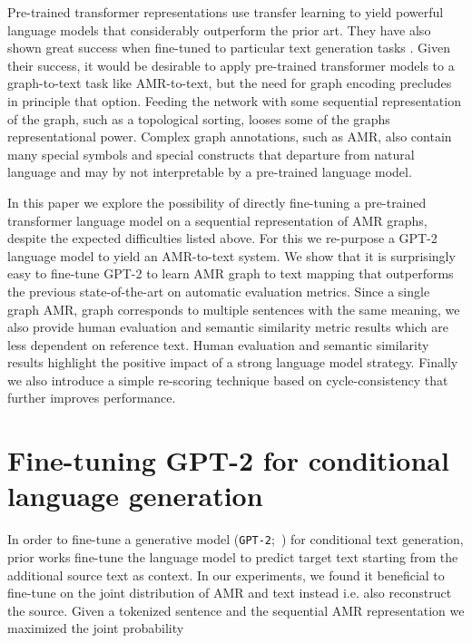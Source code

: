 \documentclass[11pt,a4paper]{article}
\newcommand{\GPT}{\texttt{GPT-2}}
\begin{document}
Pre-trained transformer representations \cite{radford2018improving,devlin2019bert,radford2019language} use transfer learning to yield powerful language models that considerably outperform the prior art. They have also shown great success when fine-tuned to particular text generation tasks \cite{see2019massively,zhang2019dialogpt,keskar2019ctrl}. Given their success, it would be desirable to apply pre-trained transformer models to a graph-to-text task like AMR-to-text, but the need for graph encoding precludes in principle that option. Feeding the network with some sequential representation of the graph, such as a topological sorting, looses some of the graphs representational power. Complex graph annotations, such as AMR, also contain many special symbols and special constructs that departure from natural language and may by not interpretable by a pre-trained language model.

In this paper we explore the possibility of directly fine-tuning a pre-trained transformer language model on a sequential representation of AMR graphs, despite the expected difficulties listed above. For this we re-purpose a GPT-2 language model \cite{radford2019language} to yield an AMR-to-text system. We show that it is surprisingly easy to fine-tune GPT-2 to learn AMR graph to text mapping that outperforms the previous state-of-the-art on automatic evaluation metrics. Since a single graph AMR, graph corresponds to multiple sentences with the same meaning, we also provide human evaluation and semantic similarity metric results \cite{bert-score} which are less dependent on reference text. Human evaluation and semantic similarity results highlight the positive impact of a strong language model strategy. Finally we also introduce a simple re-scoring technique based on cycle-consistency that further improves performance. 
 
\section{Fine-tuning GPT-2 for conditional language generation}
\label{sec:Model}

In order to fine-tune a generative model (\GPT;~) for conditional text generation, prior works fine-tune the language model to predict target text starting from the additional source text as context. In our experiments, we found it beneficial to fine-tune on the joint distribution of AMR and text instead i.e. also reconstruct the source. Given a tokenized sentence  and the sequential AMR representation  we maximized the joint probability
\end{document}
